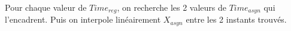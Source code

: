 Pour chaque valeur de $Time_{reg}$, on recherche les 2 valeurs 
de $Time_{asyn}$ qui l'encadrent.
Puis on interpole lin\'eairement $X_{asyn}$ entre 
les 2 instants trouv\'es.
